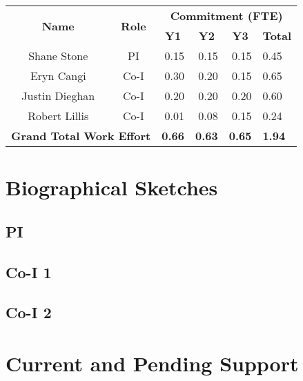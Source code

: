 \documentclass[oneside,12pt]{article}
\begin{document}
    \begin{table}[h]
        \centering
        \begin{tabular}{|c|c|r|r|r|l|}
            \hline
            \multirow{2}{*}{\textbf{Name}} & \multirow{2}{*}{\textbf{Role}} & \multicolumn{4}{c|}{\textbf{Commitment (FTE)}} \\
            \cline{3-6}
            & & \multicolumn{1}{c|}{\textbf{Y1}} & \multicolumn{1}{c|}{\textbf{Y2}} & \multicolumn{1}{c|}{\textbf{Y3}} & \multicolumn{1}{c|}{\textbf{Total}} \\
            \hline
            Shane Stone    & PI   & 0.15 & 0.15 & 0.15 & 0.45 \\
            Eryn Cangi     & Co-I & 0.30 & 0.20 & 0.15 & 0.65 \\
            Justin Dieghan & Co-I & 0.20 & 0.20 & 0.20 & 0.60 \\
            Robert Lillis  & Co-I & 0.01 & 0.08 & 0.15 & 0.24 \\
            \hline
            \multicolumn{2}{|l|}{\textbf{Grand Total Work Effort}} & \textbf{0.66} & \textbf{0.63} & \textbf{0.65} & \textbf{1.94} \\
            \hline
        \end{tabular}
    \end{table}

    \clearpage


    \section{Biographical Sketches}

    \subsection{PI}

    \subsection{Co-I 1}

    \subsection{Co-I 2}


    \section{Current and Pending Support}
\end{document}
